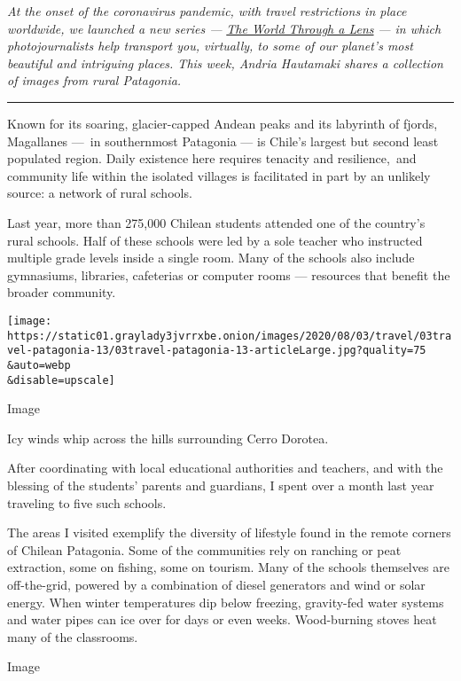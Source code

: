 \emph{At the onset of the coronavirus pandemic, with travel restrictions
in place worldwide, we launched a new series ---}
\href{https://www.nytimes3xbfgragh.onion/column/the-world-through-a-lens}{\emph{The
World Through a Lens}} \emph{--- in which photojournalists help
transport you, virtually, to some of our planet's most beautiful and
intriguing places. This week, Andria Hautamaki shares a collection of
images from rural Patagonia.}

\begin{center}\rule{0.5\linewidth}{\linethickness}\end{center}

Known for its soaring, glacier-capped Andean peaks and its labyrinth of
fjords, Magallanes ---~in southernmost Patagonia --- is Chile's largest
but second least populated region. Daily existence here requires
tenacity and resilience,~and community life within the isolated villages
is facilitated in part by an unlikely source: a network of rural
schools.

Last year, more than 275,000 Chilean students attended one of the
country's rural schools. Half of these schools were led by a sole
teacher who instructed multiple grade levels inside a single room. Many
of the schools also include gymnasiums, libraries, cafeterias or
computer rooms --- resources that benefit the broader community.

\texttt{[image: https://static01.graylady3jvrrxbe.onion/images/2020/08/03/travel/03travel-patagonia-13/03travel-patagonia-13-articleLarge.jpg?quality=75\\\&auto=webp\\\&disable=upscale]}

Image

Icy winds whip across the hills surrounding Cerro Dorotea.

After coordinating with local educational authorities and teachers, and
with the blessing of the students' parents and guardians, I spent over a
month last year traveling to five such schools.

The areas I visited exemplify the diversity of lifestyle found in the
remote corners of Chilean Patagonia. Some of the communities rely on
ranching or peat extraction, some on fishing, some on tourism. Many of
the schools themselves are off-the-grid, powered by a combination of
diesel generators and wind or solar energy. When winter temperatures dip
below freezing, gravity-fed water systems and water pipes can ice over
for days or even weeks. Wood-burning stoves heat many of the classrooms.

Image

